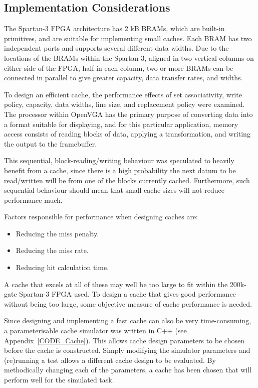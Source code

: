 \subsection{Implementation Considerations}
The Spartan-3 FPGA architecture has 2 kB BRAMs, which are built-in primitives,
and are suitable for implementing small caches. Each BRAM has two independent
ports and supports several different data widths. Due to the locations of the
BRAMs within the Spartan-3, aligned in two vertical columns on either side of the
FPGA, half in each column, two or more BRAMs can be connected in parallel to give
greater capacity, data transfer rates, and widths.

To design an efficient cache, the performance effects of set associativity, write
policy, capacity, data widths, line size, and replacement policy were examined.
The processor within OpenVGA has the primary purpose of converting data into a
format suitable for displaying, and for this particular application, memory
access consists of reading blocks of data, applying a transformation, and writing
the output to the framebuffer.

This sequential, block-reading/writing behaviour was speculated to heavily
benefit from a cache, since there is a high probability the next datum to be
read/written will be from one of the blocks currently cached. Furthermore, such
sequential behaviour should mean that small cache sizes will not reduce
performance much.

Factors responsible for performance when designing caches are:
\begin{itemize}
	\item Reducing the miss penalty.
	\item Reducing the miss rate.
	\item Reducing hit calculation time.
\end{itemize}
A cache that excels at all of these may well be too large to fit within the
200k-gate Spartan-3 FPGA used. To design a cache that gives good performance
without being too large, some objective measure of cache performance is needed.

Since designing and implementing a fast cache can also be very time-consuming, a
parameterisable cache simulator was written in C++ (see
Appendix~\ref{CODE_Cache}). This allows cache design parameters to be chosen
before the cache is constructed. Simply modifying the simulator parameters and
(re)running a test allows a different cache design to be evaluated. By
methodically changing each of the parameters, a cache has been chosen that will
perform well for the simulated task.

